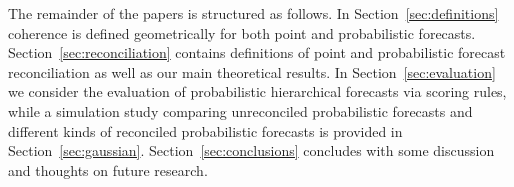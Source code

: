 \documentclass[a4paper, 11pt]{article}
\theoremstyle{definition}
\begin{document}
The remainder of the papers is structured as follows. In Section~\ref{sec:definitions} coherence is defined geometrically for both point and probabilistic forecasts. Section~\ref{sec:reconciliation} contains definitions of point and probabilistic forecast reconciliation as well as our main theoretical results. In Section~\ref{sec:evaluation} we consider the evaluation of probabilistic hierarchical forecasts via scoring rules, while a simulation study comparing unreconciled probabilistic forecasts and different kinds of reconciled probabilistic forecasts is provided in Section~\ref{sec:gaussian}. Section~\ref{sec:conclusions} concludes with some discussion and thoughts on future research.



\end{document}

